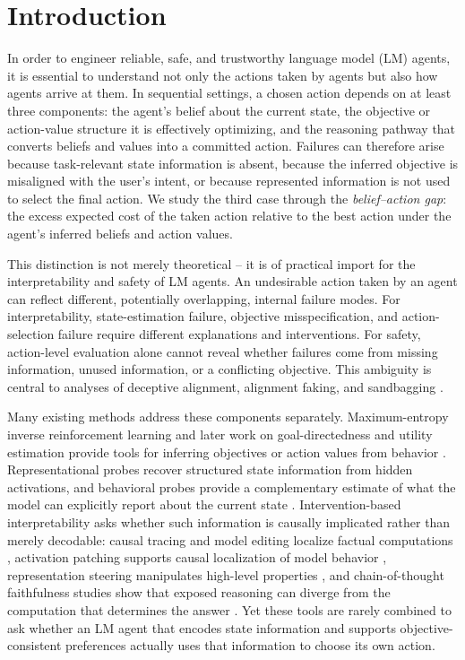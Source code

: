 \documentclass[10pt,twocolumn]{article}
\begin{document}
\section{Introduction}
In order to engineer reliable, safe, and trustworthy language model (LM) agents, it is essential to understand not only the actions taken by agents but also how agents arrive at them. In sequential settings, a chosen action depends on at least three components: the agent's belief about the current state, the objective or action-value structure it is effectively optimizing, and the reasoning pathway that converts beliefs and values into a committed action. Failures can therefore arise because task-relevant state information is absent, because the inferred objective is misaligned with the user's intent, or because represented information is not used to select the final action. We study the third case through the \emph{belief--action gap}: the excess expected cost of the taken action relative to the best action under the agent's inferred beliefs and action values.

This distinction is not merely theoretical -- it is of practical import for the interpretability and safety of LM agents. 
An undesirable action taken by an agent can reflect different, potentially overlapping, internal failure modes. For interpretability, state-estimation failure, objective misspecification, and action-selection failure require different
explanations and interventions. For safety, action-level evaluation alone cannot reveal whether failures come from missing information, unused information, or a conflicting objective. This ambiguity is central to analyses of deceptive alignment, alignment faking, and sandbagging
\cite{hubinger2019risks,greenblatt2024faking,vanderweij2025sandbagging}.

Many existing methods address these components separately. Maximum-entropy inverse reinforcement learning and later work on goal-directedness and utility estimation provide tools for inferring objectives or action values from behavior \cite{ziebartMaximumEntropyInverse2008a,macdermott_measuring_2024,mazeika_utility_2025,bellot2025limits}. Representational probes recover structured state information from hidden activations, and behavioral probes provide a complementary estimate of what the model can explicitly report about the current state \cite{alain2016understanding,li2023emergent,nanda-etal-2023-emergent,gurnee2024language,arghal2026behavioural,martorell_text_2026}. Intervention-based interpretability asks whether such information is causally implicated rather than merely decodable: causal tracing and model editing localize factual computations \cite{meng2022locating}, activation patching supports causal localization of model behavior \cite{kramar2024atpstar}, representation steering manipulates high-level properties \cite{zou2023representation}, and chain-of-thought faithfulness studies show that exposed reasoning can diverge from the computation that determines the answer \cite{lanham2023measuring}. Yet these tools are rarely combined to ask whether an LM agent that encodes state information and supports objective-consistent preferences actually uses that information to choose its own action.
\end{document}
